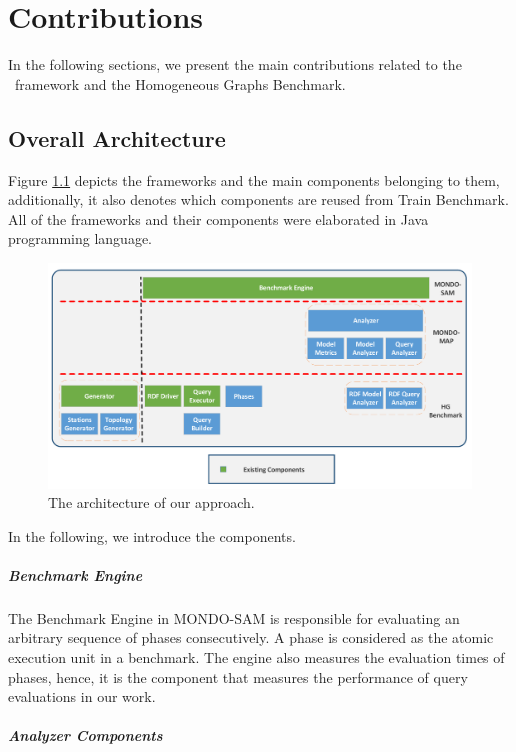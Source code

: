 \chapter{Contributions}

In the following sections, we present the main contributions related to the \framework~framework and the Homogeneous Graphs Benchmark.

\section{Overall Architecture}

Figure \ref{fig:architecture} depicts the frameworks and the main components belonging to them, additionally, it also denotes which components are reused from Train Benchmark. All of the frameworks and their components were elaborated in Java programming language.

\begin{figure}[!ht]
	\centering
	\includegraphics[width=150mm, keepaspectratio]{figures/architecture.pdf}
	\caption{The architecture of our approach.}
	\label{fig:architecture}
\end{figure}

In the following, we introduce the components.

\paragraph{Benchmark Engine}
The \textsf{Benchmark Engine} in MONDO-SAM is responsible for evaluating an arbitrary sequence of phases consecutively. A phase is considered as the atomic execution unit in a benchmark. The engine also measures the evaluation times of phases, hence, it is the component that measures the performance of query evaluations in our work.

\paragraph{Analyzer Components}

